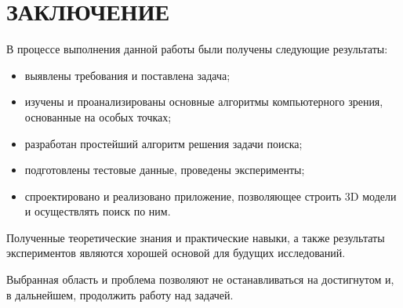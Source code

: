 \chapter*{ЗАКЛЮЧЕНИЕ}    

В процессе выполнения данной работы были получены следующие результаты:

\begin{itemize}
    \item выявлены требования и поставлена задача;
    \item изучены и проанализированы основные алгоритмы компьютерного зрения, основанные на особых точках;
    \item разработан простейший алгоритм решения задачи поиска;
    \item подготовлены тестовые данные, проведены эксперименты;
    \item спроектировано и реализовано приложение, позволяющее строить 3D модели и осуществлять поиск по ним.
\end{itemize}

Полученные теоретические знания и практические навыки, а также результаты экспериментов являются хорошей основой для будущих исследований. 

Выбранная область и проблема позволяют не останавливаться на достигнутом и, в дальнейшем, продолжить работу над задачей.
\newpage